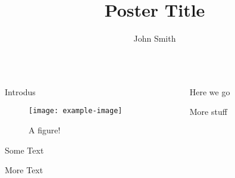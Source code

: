 \documentclass{beamer}
\title[Conference Name]{Poster Title}
\author{John Smith\inst{1}}
\institute[University Name]{\inst{1} University Name, Country}
\begin{document}
    \begin{frame}[t]
        \begin{columns}[T]
            \begin{column}{.3\textwidth}
                \begin{block}{Introdus}
                    \begin{figure}%
                        \texttt{[image: example-image]}
                        \caption{A figure!}
                        \label{fig:fig1}
                    \end{figure}
                \end{block}
                \begin{block}{Some Text}
                    \lipsum[1]
                \end{block}
                \begin{block}{More Text}
                    \lipsum[2]
                \end{block}
            \end{column}
            \begin{column}{.3\textwidth}
                \begin{block}{Here we go}
                    \lipsum[1]  
                \end{block}
                \begin{block}{More stuff}
                    \lipsum[2]
                \end{block}
            \end{column}
            \begin{column}{.3\textwidth}
            \end{column}
        \end{columns}
    \end{frame}
\end{document}
